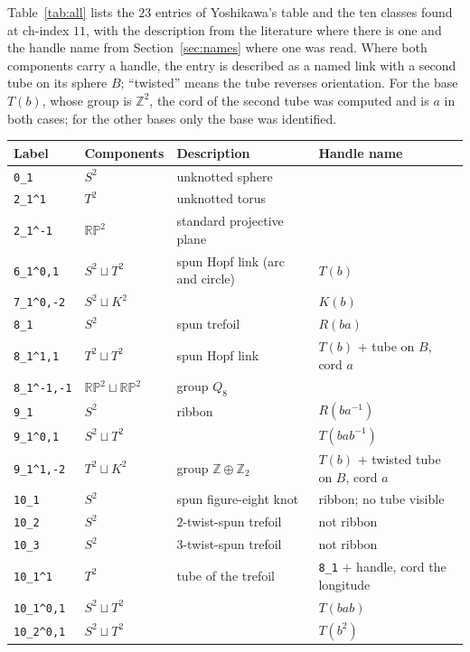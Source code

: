 \documentclass[11pt]{amsart}
\newcommand{\RP}{\mathbb{RP}^2}
\newcommand{\Z}{\mathbb{Z}}
\newcommand{\lab}[1]{\texttt{#1}}
\newcommand{\inv}{^{-1}}
\theoremstyle{plain}
\theoremstyle{remark}
\begin{document}
Table~\ref{tab:all} lists the $23$ entries of Yoshikawa's table and the ten classes found at ch-index
$11$, with the description from the literature where there is one and the handle name from
Section~\ref{sec:names} where one was read. Where both components carry a handle, the entry is described as a named link with a second tube on its
sphere $B$; ``twisted'' means the tube reverses orientation. For the base $T(b)$, whose group is
$\Z^2$, the cord of the second tube was computed and is $a$ in both cases; for the other bases only
the base was identified.

\begin{table}[ht]
\centering
\footnotesize
\begin{tabular}{@{}llll@{}}
\toprule
Label & Components & Description & Handle name \\
\midrule
\lab{0\_1} & $S^2$ & unknotted sphere & \\
\lab{2\_1\^{}1} & $T^2$ & unknotted torus & \\
\lab{2\_1\^{}-1} & $\RP$ & standard projective plane & \\
\lab{6\_1\^{}0,1} & $S^2\sqcup T^2$ & spun Hopf link (arc and circle) & $T(b)$ \\
\lab{7\_1\^{}0,-2} & $S^2\sqcup K^2$ & & $K(b)$ \\
\lab{8\_1} & $S^2$ & spun trefoil & $R(ba)$ \\
\lab{8\_1\^{}1,1} & $T^2\sqcup T^2$ & spun Hopf link & $T(b)$ $+$ tube on $B$, cord $a$ \\
\lab{8\_1\^{}-1,-1} & $\RP\sqcup\RP$ & group $Q_8$ & \\
\lab{9\_1} & $S^2$ & ribbon & $R(ba\inv)$ \\
\lab{9\_1\^{}0,1} & $S^2\sqcup T^2$ & & $T(bab\inv)$ \\
\lab{9\_1\^{}1,-2} & $T^2\sqcup K^2$ & group $\Z\oplus\Z_2$ & $T(b)$ $+$ twisted tube on $B$, cord $a$ \\
\lab{10\_1} & $S^2$ & spun figure-eight knot & ribbon; no tube visible \\
\lab{10\_2} & $S^2$ & $2$-twist-spun trefoil & not ribbon \\
\lab{10\_3} & $S^2$ & $3$-twist-spun trefoil & not ribbon \\
\lab{10\_1\^{}1} & $T^2$ & tube of the trefoil & \lab{8\_1} $+$ handle, cord the longitude \\
\lab{10\_1\^{}0,1} & $S^2\sqcup T^2$ & & $T(bab)$ \\
\lab{10\_2\^{}0,1} & $S^2\sqcup T^2$ & & $T(b^2)$ \\

\end{tabular}
\end{table}
\end{document}
